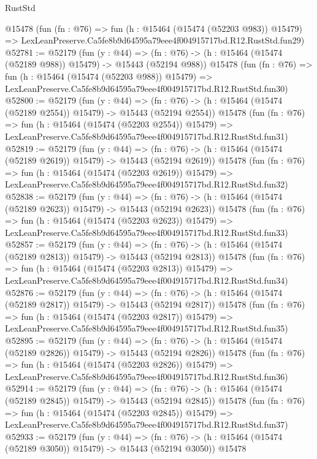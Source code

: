 \begin{lexlean}{RustStd}
\begin{coremodule}
    @15478
    (fun (fn : @76) =>
    fun (h : @15464 (@15474 (@52203 @983)) @15479) =>
    LexLeanPreserve.Ca5fe8b9d64595a79eee4f004915717bd.R12.RustStd.fun29)
@52781 := @52179
    (fun (y : @44) =>
    (fn : @76) -> (h : @15464 (@15474 (@52189 @988)) @15479) -> @15443 (@52194 @988))
    @15478
    (fun (fn : @76) =>
    fun (h : @15464 (@15474 (@52203 @988)) @15479) =>
    LexLeanPreserve.Ca5fe8b9d64595a79eee4f004915717bd.R12.RustStd.fun30)
@52800 := @52179
    (fun (y : @44) =>
    (fn : @76) -> (h : @15464 (@15474 (@52189 @2554)) @15479) -> @15443 (@52194 @2554))
    @15478
    (fun (fn : @76) =>
    fun (h : @15464 (@15474 (@52203 @2554)) @15479) =>
    LexLeanPreserve.Ca5fe8b9d64595a79eee4f004915717bd.R12.RustStd.fun31)
@52819 := @52179
    (fun (y : @44) =>
    (fn : @76) -> (h : @15464 (@15474 (@52189 @2619)) @15479) -> @15443 (@52194 @2619))
    @15478
    (fun (fn : @76) =>
    fun (h : @15464 (@15474 (@52203 @2619)) @15479) =>
    LexLeanPreserve.Ca5fe8b9d64595a79eee4f004915717bd.R12.RustStd.fun32)
@52838 := @52179
    (fun (y : @44) =>
    (fn : @76) -> (h : @15464 (@15474 (@52189 @2623)) @15479) -> @15443 (@52194 @2623))
    @15478
    (fun (fn : @76) =>
    fun (h : @15464 (@15474 (@52203 @2623)) @15479) =>
    LexLeanPreserve.Ca5fe8b9d64595a79eee4f004915717bd.R12.RustStd.fun33)
@52857 := @52179
    (fun (y : @44) =>
    (fn : @76) -> (h : @15464 (@15474 (@52189 @2813)) @15479) -> @15443 (@52194 @2813))
    @15478
    (fun (fn : @76) =>
    fun (h : @15464 (@15474 (@52203 @2813)) @15479) =>
    LexLeanPreserve.Ca5fe8b9d64595a79eee4f004915717bd.R12.RustStd.fun34)
@52876 := @52179
    (fun (y : @44) =>
    (fn : @76) -> (h : @15464 (@15474 (@52189 @2817)) @15479) -> @15443 (@52194 @2817))
    @15478
    (fun (fn : @76) =>
    fun (h : @15464 (@15474 (@52203 @2817)) @15479) =>
    LexLeanPreserve.Ca5fe8b9d64595a79eee4f004915717bd.R12.RustStd.fun35)
@52895 := @52179
    (fun (y : @44) =>
    (fn : @76) -> (h : @15464 (@15474 (@52189 @2826)) @15479) -> @15443 (@52194 @2826))
    @15478
    (fun (fn : @76) =>
    fun (h : @15464 (@15474 (@52203 @2826)) @15479) =>
    LexLeanPreserve.Ca5fe8b9d64595a79eee4f004915717bd.R12.RustStd.fun36)
@52914 := @52179
    (fun (y : @44) =>
    (fn : @76) -> (h : @15464 (@15474 (@52189 @2845)) @15479) -> @15443 (@52194 @2845))
    @15478
    (fun (fn : @76) =>
    fun (h : @15464 (@15474 (@52203 @2845)) @15479) =>
    LexLeanPreserve.Ca5fe8b9d64595a79eee4f004915717bd.R12.RustStd.fun37)
@52933 := @52179
    (fun (y : @44) =>
    (fn : @76) -> (h : @15464 (@15474 (@52189 @3050)) @15479) -> @15443 (@52194 @3050))
    @15478

\end{coremodule}
\end{lexlean}
